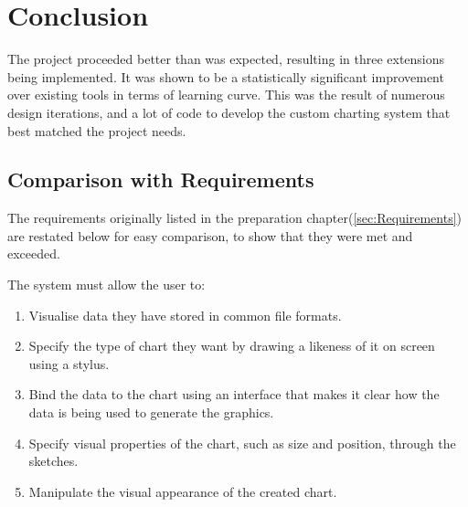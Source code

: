 \chapter{Conclusion}
The project proceeded better than was expected, resulting in three extensions being implemented. It was shown to be a statistically significant improvement over existing tools in terms of learning curve. This was the result of numerous design iterations, and a lot of code to develop the custom charting system that best matched the project needs.

\section{Comparison with Requirements}
The requirements originally listed in the preparation chapter(\autoref{sec:Requirements}) are restated below for easy comparison, to show that they were met and exceeded.


The system must allow the user to:
	\begin{enumerate}[label=\bfseries Core \arabic*]
		\item Visualise data they have stored in common file formats.
		\item Specify the type of chart they want by drawing a likeness of it on screen using a stylus.
		\item Bind the data to the chart using an interface that makes it clear how the data is being used to generate the graphics.
		\item Specify visual properties of the chart, such as size and position, through the sketches.
		\item Manipulate the visual appearance of the created chart.
	\end{enumerate}
	
